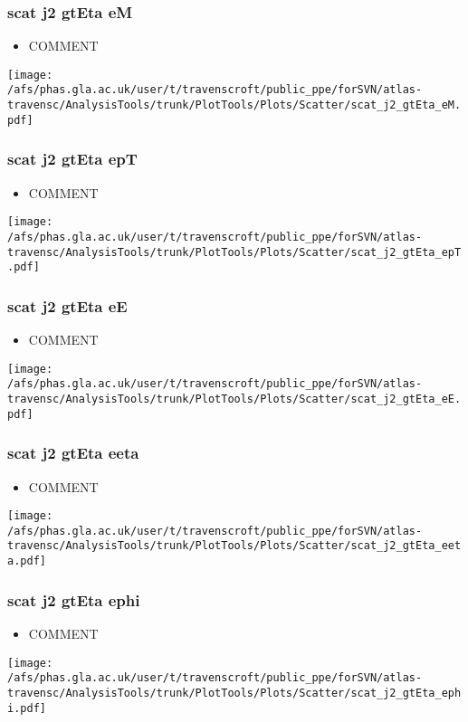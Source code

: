 \documentclass{beamer}
\begin{document}
\begin{frame}
\frametitle{scat j2 gtEta eM}
\begin{itemize}
\item COMMENT
\end{itemize}
\begin{center}
\texttt{[image: /afs/phas.gla.ac.uk/user/t/travenscroft/public\_ppe/forSVN/atlas-travensc/AnalysisTools/trunk/PlotTools/Plots/Scatter/scat\_j2\_gtEta\_eM.pdf]}
\end{center}
\end{frame}

\begin{frame}
\frametitle{scat j2 gtEta epT}
\begin{itemize}
\item COMMENT
\end{itemize}
\begin{center}
\texttt{[image: /afs/phas.gla.ac.uk/user/t/travenscroft/public\_ppe/forSVN/atlas-travensc/AnalysisTools/trunk/PlotTools/Plots/Scatter/scat\_j2\_gtEta\_epT.pdf]}
\end{center}
\end{frame}

\begin{frame}
\frametitle{scat j2 gtEta eE}
\begin{itemize}
\item COMMENT
\end{itemize}
\begin{center}
\texttt{[image: /afs/phas.gla.ac.uk/user/t/travenscroft/public\_ppe/forSVN/atlas-travensc/AnalysisTools/trunk/PlotTools/Plots/Scatter/scat\_j2\_gtEta\_eE.pdf]}
\end{center}
\end{frame}

\begin{frame}
\frametitle{scat j2 gtEta eeta}
\begin{itemize}
\item COMMENT
\end{itemize}
\begin{center}
\texttt{[image: /afs/phas.gla.ac.uk/user/t/travenscroft/public\_ppe/forSVN/atlas-travensc/AnalysisTools/trunk/PlotTools/Plots/Scatter/scat\_j2\_gtEta\_eeta.pdf]}
\end{center}
\end{frame}

\begin{frame}
\frametitle{scat j2 gtEta ephi}
\begin{itemize}
\item COMMENT
\end{itemize}
\begin{center}
\texttt{[image: /afs/phas.gla.ac.uk/user/t/travenscroft/public\_ppe/forSVN/atlas-travensc/AnalysisTools/trunk/PlotTools/Plots/Scatter/scat\_j2\_gtEta\_ephi.pdf]}
\end{center}
\end{frame}
\end{document}
